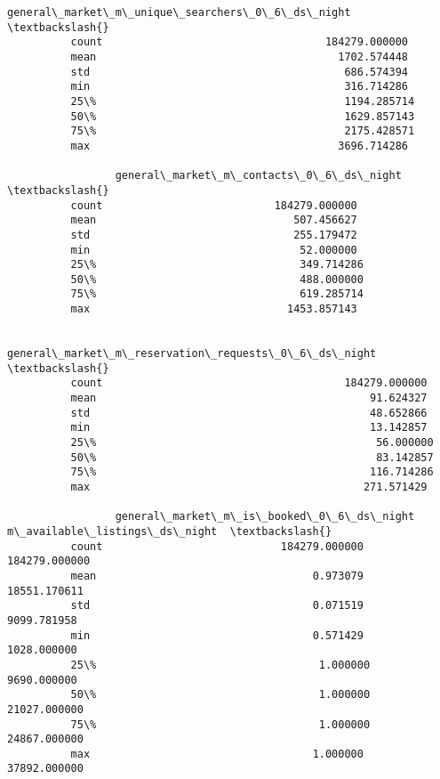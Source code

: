 \documentclass[11pt]{article}
\begin{document}
\begin{Verbatim}[commandchars=\\\{\}]
                 general\_market\_m\_unique\_searchers\_0\_6\_ds\_night  \textbackslash{}
          count                                   184279.000000   
          mean                                      1702.574448   
          std                                        686.574394   
          min                                        316.714286   
          25\%                                       1194.285714   
          50\%                                       1629.857143   
          75\%                                       2175.428571   
          max                                       3696.714286   
          
                 general\_market\_m\_contacts\_0\_6\_ds\_night  \textbackslash{}
          count                           184279.000000   
          mean                               507.456627   
          std                                255.179472   
          min                                 52.000000   
          25\%                                349.714286   
          50\%                                488.000000   
          75\%                                619.285714   
          max                               1453.857143   
          
                 general\_market\_m\_reservation\_requests\_0\_6\_ds\_night  \textbackslash{}
          count                                      184279.000000    
          mean                                           91.624327    
          std                                            48.652866    
          min                                            13.142857    
          25\%                                            56.000000    
          50\%                                            83.142857    
          75\%                                           116.714286    
          max                                           271.571429    
          
                 general\_market\_m\_is\_booked\_0\_6\_ds\_night  m\_available\_listings\_ds\_night  \textbackslash{}
          count                            184279.000000                  184279.000000   
          mean                                  0.973079                   18551.170611   
          std                                   0.071519                    9099.781958   
          min                                   0.571429                    1028.000000   
          25\%                                   1.000000                    9690.000000   
          50\%                                   1.000000                   21027.000000   
          75\%                                   1.000000                   24867.000000   
          max                                   1.000000                   37892.000000   
          

\end{Verbatim}
\end{document}
